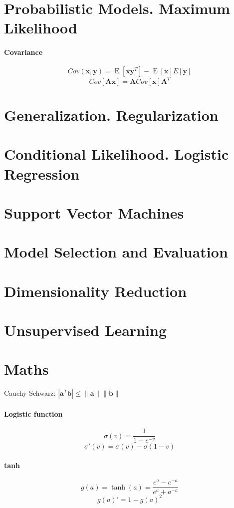 \documentclass[7pt]{scrartcl}
\DeclareMathOperator{\E}{E}
\begin{document}
\begin{multicols}{4}
\section{Probabilistic Models. Maximum Likelihood}
\paragraph{Covariance}

$$Cov(\mathbf x, \mathbf y) = \E[\mathbf x \mathbf y ^ T] - \E[\mathbf x]E[\mathbf y]$$
$$Cov[\mathbf A \mathbf x] = \mathbf A Cov[\mathbf x] \mathbf A^T$$


\section{Generalization. Regularization}
\section{Conditional Likelihood. Logistic Regression}
\section{Support Vector Machines}
\section{Model Selection and Evaluation}
\section{Dimensionality Reduction}
\section{Unsupervised Learning}
\section{Maths}
Cauchy-Schwarz: $|\mathbf a ^T \mathbf b|\leq \| \mathbf a \| \| \mathbf b \|$
\paragraph{Logistic function}
$$\sigma(v) = \frac{1}{1+e^{-v}}$$
$$\sigma'(v) = \sigma(v)-\sigma(1-v)$$
\paragraph{tanh}
$$g(a)=\tanh(a)=\frac{e^a-e^{-a}}{e^a + a^{-a}}$$
$$g(a)'=1 - g(a)^2$$
\end{multicols}
\end{document}
